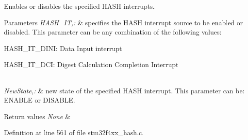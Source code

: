 Enables or disables the specified H\-A\-S\-H interrupts. 


\begin{DoxyParams}{Parameters}
{\em H\-A\-S\-H\-\_\-\-I\-T,\-:} & specifies the H\-A\-S\-H interrupt source to be enabled or disabled. This parameter can be any combination of the following values\-: \begin{DoxyItemize}
\item H\-A\-S\-H\-\_\-\-I\-T\-\_\-\-D\-I\-N\-I\-: Data Input interrupt \item H\-A\-S\-H\-\_\-\-I\-T\-\_\-\-D\-C\-I\-: Digest Calculation Completion Interrupt \end{DoxyItemize}
\\
\hline
{\em New\-State,\-:} & new state of the specified H\-A\-S\-H interrupt. This parameter can be\-: E\-N\-A\-B\-L\-E or D\-I\-S\-A\-B\-L\-E. \\
\hline
\end{DoxyParams}

\begin{DoxyRetVals}{Return values}
{\em None} & \\
\hline
\end{DoxyRetVals}


Definition at line 561 of file stm32f4xx\-\_\-hash.\-c.


